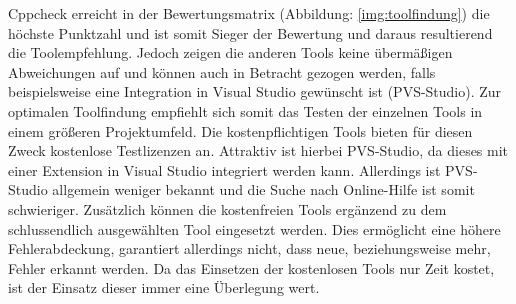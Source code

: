 Cppcheck erreicht in der Bewertungsmatrix (Abbildung: \ref{img:toolfindung}) die höchste Punktzahl und ist somit Sieger der Bewertung und daraus resultierend die Toolempfehlung.
Jedoch zeigen die anderen Tools keine übermäßigen Abweichungen auf und können auch in Betracht gezogen werden, falls beispielsweise eine Integration in Visual Studio gewünscht ist
(PVS-Studio). \newline
Zur optimalen Toolfindung empfiehlt sich somit das Testen der einzelnen Tools in einem größeren Projektumfeld. Die kostenpflichtigen Tools bieten für diesen Zweck kostenlose
Testlizenzen an. Attraktiv ist hierbei PVS-Studio, da dieses mit einer Extension in Visual Studio integriert werden kann. Allerdings ist PVS-Studio allgemein weniger bekannt und die Suche nach Online-Hilfe ist somit schwieriger. \newline
Zusätzlich können die kostenfreien Tools ergänzend zu dem schlussendlich ausgewählten Tool eingesetzt werden. Dies ermöglicht eine höhere Fehlerabdeckung, garantiert allerdings nicht,
dass neue, beziehungsweise mehr, Fehler erkannt werden. Da das Einsetzen der kostenlosen Tools nur Zeit kostet, ist der Einsatz dieser immer eine Überlegung wert.